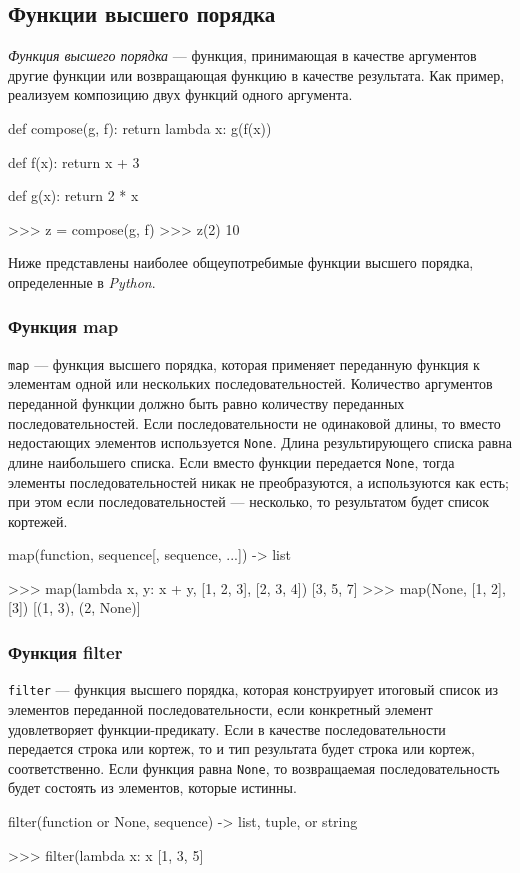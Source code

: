 \subsection{Функции высшего порядка}
\emph{Функция высшего порядка} — функция, принимающая в качестве аргументов другие функции или возвращающая функцию в качестве результата. Как пример, реализуем композицию двух функций одного аргумента.
\begin{pylst}{}{}
def compose(g, f):
    return lambda x: g(f(x))

def f(x):
    return x + 3

def g(x):
    return 2 * x

>>> z = compose(g, f)
>>> z(2)
10
\end{pylst}

Ниже представлены наиболее общеупотребимые функции высшего порядка, определенные в \emph{Python}.

\subsubsection{Функция map}
\lstinline{map} — функция высшего порядка, которая применяет переданную функция к элементам одной или нескольких последовательностей. Количество аргументов переданной функции должно быть равно количеству переданных последовательностей. Если последовательности не одинаковой длины, то вместо недостающих элементов используется \lstinline{None}. Длина результирующего списка равна длине наибольшего списка. Если вместо функции передается \lstinline{None}, тогда элементы последовательностей никак не преобразуются, а используются как есть; при этом если последовательностей — несколько, то результатом будет список кортежей.
\begin{pylst}{}{}
map(function, sequence[, sequence, ...]) -> list

>>> map(lambda x, y: x + y, [1, 2, 3], [2, 3, 4])
[3, 5, 7]
>>> map(None, [1, 2], [3])
[(1, 3), (2, None)]
\end{pylst}

\subsubsection{Функция filter}
\lstinline{filter} — функция высшего порядка, которая конструирует итоговый список из элементов переданной последовательности, если конкретный элемент удовлетворяет функции-предикату. Если в качестве последовательности передается строка или кортеж, то и тип результата будет строка или кортеж, соответственно. Если функция равна \lstinline{None}, то возвращаемая последовательность будет состоять из элементов, которые истинны.
\begin{pylst}{}{}
filter(function or None, sequence) -> list, tuple, or string

>>> filter(lambda x: x %
[1, 3, 5]
\end{pylst}

